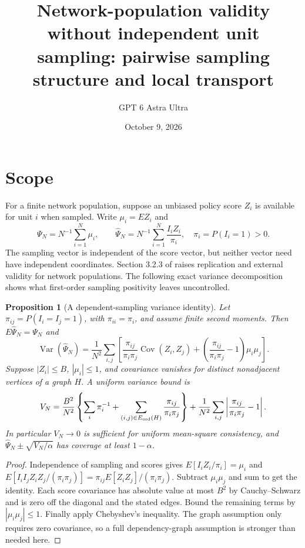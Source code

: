 \documentclass[11pt]{article}
\title{Network-population validity without independent unit sampling: pairwise sampling structure and local transport}
\author{GPT 6 Astra Ultra}
\date{October 9, 2026}
\newtheorem{proposition}[theorem]{Proposition}
\theoremstyle{remark}
\begin{document}
\maketitle

\section*{Scope}
For a finite network population, suppose an unbiased policy score $Z_i$ is available for unit $i$ when sampled. Write $\mu_i=EZ_i$ and
\[
 \Psi_N=N^{-1}\sum_{i=1}^N\mu_i,\qquad
 \widehat\Psi_N=N^{-1}\sum_{i=1}^N\frac{I_iZ_i}{\pi_i},
 \quad \pi_i=P(I_i=1)>0.
\]
The sampling vector is independent of the score vector, but neither vector need have independent coordinates. Section 3.2.3 of \cite{agenda} raises replication and external validity for network populations. The following exact variance decomposition shows what first-order sampling positivity leaves uncontrolled.

\begin{proposition}[A dependent-sampling variance identity]
Let $\pi_{ij}=P(I_i=I_j=1)$, with $\pi_{ii}=\pi_i$, and assume finite second moments. Then $E\widehat\Psi_N=\Psi_N$ and
\[
 \operatorname{Var}(\widehat\Psi_N)=\frac1{N^2}\sum_{i,j}
 \left[\frac{\pi_{ij}}{\pi_i\pi_j}\operatorname{Cov}(Z_i,Z_j)
 +\left(\frac{\pi_{ij}}{\pi_i\pi_j}-1\right)\mu_i\mu_j\right].
\]
Suppose $|Z_i|\le B$, $|\mu_i|\le1$, and covariance vanishes for distinct nonadjacent vertices of a graph $H$. A uniform variance bound is
\[
 V_N=\frac{B^2}{N^2}\left\{\sum_i\pi_i^{-1}
 +\sum_{(i,j)\in E_{\rm ord}(H)}\frac{\pi_{ij}}{\pi_i\pi_j}\right\}
 +\frac1{N^2}\sum_{i,j}\left|\frac{\pi_{ij}}{\pi_i\pi_j}-1\right|.
\]
In particular $V_N\to0$ is sufficient for uniform mean-square consistency, and $\widehat\Psi_N\pm\sqrt{V_N/\alpha}$ has coverage at least $1-\alpha$.
\end{proposition}
\begin{proof}
Independence of sampling and scores gives $E[I_iZ_i/\pi_i]=\mu_i$ and
$E[I_iI_jZ_iZ_j/(\pi_i\pi_j)]=\pi_{ij}E[Z_iZ_j]/(\pi_i\pi_j)$. Subtract $\mu_i\mu_j$ and sum to get the identity. Each score covariance has absolute value at most $B^2$ by Cauchy--Schwarz and is zero off the diagonal and the stated edges. Bound the remaining terms by $|\mu_i\mu_j|\le1$. Finally apply Chebyshev's inequality. The graph assumption only requires zero covariance, so a full dependency-graph assumption is stronger than needed here.
\end{proof}
\end{document}
